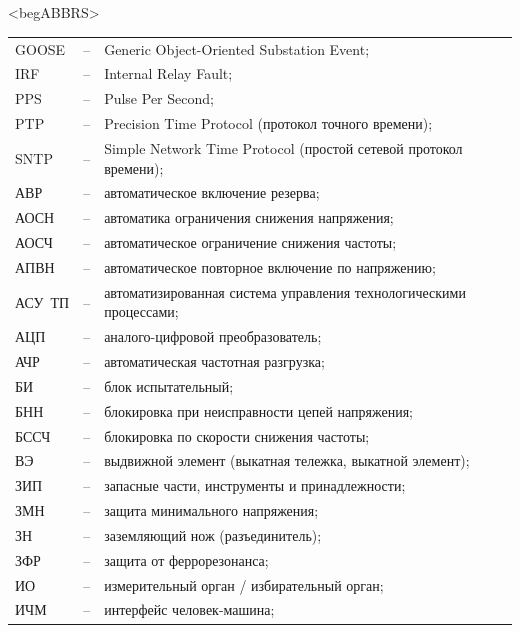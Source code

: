 \color{unimain}\section*{}
{\color{white}\fontsize{0.1pt}{0.1pt}\selectfont<begABBRS>}
\color{black}
\begin{longtable}{>{\raggedright\arraybackslash}m{2cm}>{\raggedright\arraybackslash}m{0.5cm}>{\raggedright\arraybackslash}m{20cm}}
\endfirsthead\endhead\endfoot\endlastfoot
GOOSE & -- & Generic Object-Oriented Substation Event; \\
IRF & -- & Internal Relay Fault; \\
PPS & -- & Pulse Per Second; \\
PTP & -- & Precision Time Protocol (протокол точного времени); \\
SNTP & -- & Simple Network Time Protocol (простой сетевой протокол времени); \\
АВР & -- & автоматическое включение резерва; \\
АОСН & -- & автоматика ограничения снижения напряжения; \\
АОСЧ & -- & автоматическое ограничение снижения частоты; \\
АПВН & -- & автоматическое повторное включение по напряжению; \\
АСУ~ТП & -- & автоматизированная система управления технологическими процессами; \\
АЦП & -- & аналого-цифровой преобразователь; \\
АЧР & -- & автоматическая частотная разгрузка; \\
БИ & -- & блок испытательный; \\
БНН & -- & блокировка при неисправности цепей напряжения; \\
БССЧ & -- & блокировка по скорости снижения частоты; \\
ВЭ & -- & выдвижной элемент (выкатная тележка, выкатной элемент); \\
ЗИП & -- & запасные части, инструменты и принадлежности; \\
ЗМН & -- & защита минимального напряжения; \\
ЗН & -- & заземляющий нож (разъединитель); \\
ЗФР & -- & защита от феррорезонанса; \\
ИО & -- & измерительный орган / избирательный орган; \\
ИЧМ & -- & интерфейс человек-машина; \\

\end{longtable}
